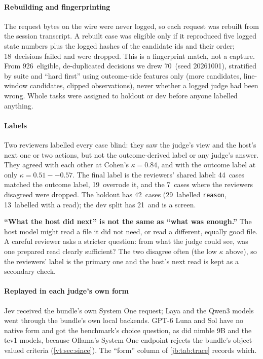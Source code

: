 \documentclass[11pt,letterpaper]{article}
\newcommand{\code}[1]{\texttt{#1}}
\newcommand{\TrAgreed}{44}
\newcommand{\TrDevN}{21}
\newcommand{\TrDrawn}{70}
\newcommand{\TrDropped}{7}
\newcommand{\TrKappaAB}{0.84}
\newcommand{\TrKappaOutcome}{0.51--0.57}
\newcommand{\TrMined}{926}
\newcommand{\TrN}{42}
\newcommand{\TrOverridden}{19}
\newcommand{\TrReadCases}{13}
\newcommand{\TrReasonLabels}{29}
\newcommand{\TrRebuildFail}{18}
\newcommand{\TrSeed}{20261001}
\begin{document}
\paragraph{Rebuilding and fingerprinting} The request bytes on the wire were never logged, so each request
was rebuilt from the session transcript. A rebuilt case was eligible only if it reproduced five logged
state numbers plus the logged hashes of the candidate ids and their order; \TrRebuildFail\ decisions failed
and were dropped. This is a fingerprint match, not a capture. From \TrMined\ eligible, de-duplicated
decisions we drew \TrDrawn\ (seed \TrSeed), stratified by suite and ``hard first'' using outcome-side
features only (more candidates, line-window candidates, clipped observations), never whether a logged judge
had been wrong. Whole tasks were assigned to holdout or dev before anyone labelled anything.

\paragraph{Labels} Two reviewers labelled every case blind: they saw the judge's view and the host's next
one or two actions, but not the outcome-derived label or any judge's answer. They agreed with each other
at Cohen's $\kappa = \TrKappaAB$, and with the outcome label at only $\kappa = \TrKappaOutcome$. The final
label is the reviewers' shared label: \TrAgreed\ cases matched the outcome label, \TrOverridden\ overrode
it, and the \TrDropped\ cases where the reviewers disagreed were dropped. The holdout has \TrN\ cases
(\TrReasonLabels\ labelled \code{reason}, \TrReadCases\ labelled with a read); the dev split has \TrDevN\
and is a screen.

\begin{keyidea}
\textbf{``What the host did next'' is not the same as ``what was enough.''} The host model might read a file
it did not need, or read a different, equally good file. A careful reviewer asks a stricter question: from
what the judge could see, was one prepared read clearly sufficient? The two disagree often (the low $\kappa$
above), so the reviewers' label is the primary one and the host's next read is kept as a secondary check.
\end{keyidea}

\paragraph{Replayed in each judge's own form} Jev received the bundle's own System One request; Laya and
the Qwen3 models went through the bundle's own local backends. GPT-6 Luna and Sol have no native form and
got the benchmark's choice question, as did nimble 9B and the tev1 models, because Ollama's System One
endpoint rejects the bundle's object-valued criteria (\cref{vt:sec:since}). The ``form'' column of
\cref{jb:tab:trace} records which.
\end{document}

